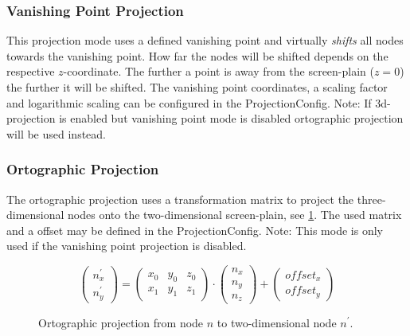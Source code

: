 \subsubsection{Vanishing Point Projection}
This projection mode uses a defined vanishing point and virtually \emph{shifts} all nodes towards the vanishing point. How far the nodes will be shifted depends on the respective $z$-coordinate. The further a point is away from the screen-plain ($z=0$) the further it will be shifted. The vanishing point coordinates, a scaling factor and logarithmic scaling can be configured in the ProjectionConfig. Note: If 3d-projection is enabled but vanishing point mode is disabled ortographic projection will be used instead.

\subsubsection{Ortographic Projection}
The ortographic projection uses a transformation matrix to project the three-dimensional nodes onto the two-dimensional screen-plain, see \ref{math:orthographicProjection}. The used matrix and a offset may be defined in the ProjectionConfig. Note: This mode is only used if the vanishing point projection is disabled.

\begin{figure} [h]
\[
\left(
\begin{array}{c}
n_{x}^{'} \\
n_{y}^{'}
\end{array}
\right)
%
=
%
\left(
\begin{array}{ccc}
x_0 & y_0 & z_0 \\
x_1 & y_1 & z_1
\end{array}
\right)
\cdot
\left(
\begin{array}{c}
n_x  \\
n_y  \\
n_z
\end{array}
\right)
%
+
%
\left(
\begin{array}{c}
offset_x \\
offset_y
\end{array}
\right)
\]
\caption{Ortographic projection from node $n$ to two-dimensional node $n^{'}$.}
\label{math:orthographicProjection}
\end{figure}

